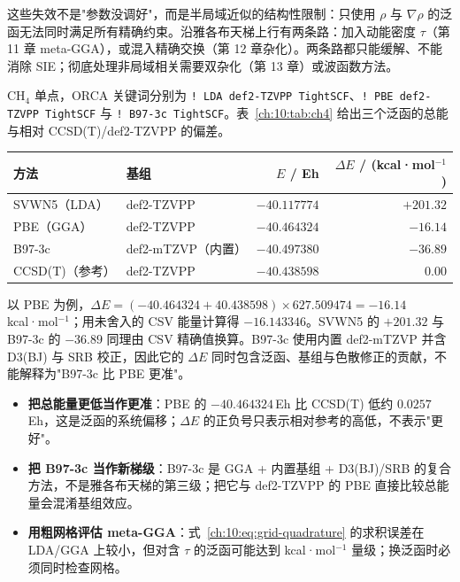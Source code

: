 这些失效不是"参数没调好"，而是半局域近似的结构性限制：只使用 $\rho$ 与 $\nabla\rho$ 的泛函无法同时满足所有精确约束。沿雅各布天梯上行有两条路：加入动能密度 $\tau$（第 11 章 meta-GGA），或混入精确交换（第 12 章杂化）。两条路都只能缓解、不能消除 SIE；彻底处理非局域相关需要双杂化（第 13 章）或波函数方法。

\begin{ch4box}
CH$_4$ 单点，ORCA 关键词分别为 \texttt{! LDA def2-TZVPP TightSCF}、\texttt{! PBE def2-TZVPP TightSCF} 与 \texttt{! B97-3c TightSCF}。表~\ref{ch:10:tab:ch4} 给出三个泛函的总能与相对 CCSD(T)/def2-TZVPP 的偏差。

\begin{center}
\small
\begin{tabular}{@{}llrr@{}}
\toprule
方法 & 基组 & $E$ / Eh & $\Delta E$ / (kcal·mol$^{-1}$) \\
\midrule
SVWN5（LDA） & def2-TZVPP & $-40.117774$ & $+201.32$ \\
PBE（GGA）   & def2-TZVPP & $-40.464324$ & $-16.14$ \\
B97-3c       & def2-mTZVP（内置） & $-40.497380$ & $-36.89$ \\
\midrule
CCSD(T)（参考） & def2-TZVPP & $-40.438598$ & $0.00$ \\
\bottomrule
\end{tabular}
\label{ch:10:tab:ch4}
\end{center}

以 PBE 为例，$\Delta E=(-40.464324+40.438598)\times 627.509474=-16.14$\,kcal·mol$^{-1}$；用未舍入的 CSV 能量计算得 $-16.143346$。SVWN5 的 $+201.32$ 与 B97-3c 的 $-36.89$ 同理由 CSV 精确值换算。B97-3c 使用内置 def2-mTZVP 并含 D3(BJ) 与 SRB 校正，因此它的 $\Delta E$ 同时包含泛函、基组与色散修正的贡献，不能解释为"B97-3c 比 PBE 更准"。
\end{ch4box}

\begin{pitfall}
\begin{itemize}
  \item \textbf{把总能量更低当作更准}：PBE 的 $-40.464324$\,Eh 比 CCSD(T) 低约 $0.0257$\,Eh，这是泛函的系统偏移；$\Delta E$ 的正负号只表示相对参考的高低，不表示"更好"。
  \item \textbf{把 B97-3c 当作新梯级}：B97-3c 是 GGA + 内置基组 + D3(BJ)/SRB 的复合方法，不是雅各布天梯的第三级；把它与 def2-TZVPP 的 PBE 直接比较总能量会混淆基组效应。
  \item \textbf{用粗网格评估 meta-GGA}：式~\eqref{ch:10:eq:grid-quadrature} 的求积误差在 LDA/GGA 上较小，但对含 $\tau$ 的泛函可能达到 kcal·mol$^{-1}$ 量级；换泛函时必须同时检查网格。
\end{itemize}
\end{pitfall}

